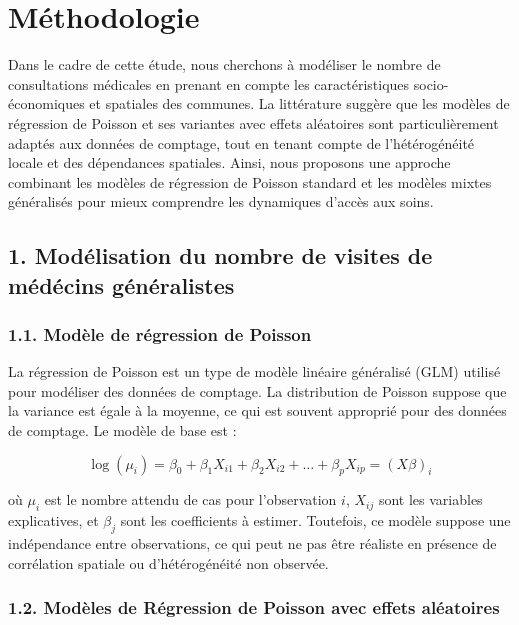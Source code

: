 \documentclass[
]{article}
\author{}
\date{\vspace{-2.5em}}
\begin{document}
\section{Méthodologie}\label{muxe9thodologie}

Dans le cadre de cette étude, nous cherchons à modéliser le nombre de
consultations médicales en prenant en compte les caractéristiques
socio-économiques et spatiales des communes. La littérature suggère que
les modèles de régression de Poisson et ses variantes avec effets
aléatoires sont particulièrement adaptés aux données de comptage, tout
en tenant compte de l'hétérogénéité locale et des dépendances spatiales.
Ainsi, nous proposons une approche combinant les modèles de régression
de Poisson standard et les modèles mixtes généralisés pour mieux
comprendre les dynamiques d'accès aux soins.

\subsection{1. Modélisation du nombre de visites de médécins
généralistes}\label{moduxe9lisation-du-nombre-de-visites-de-muxe9duxe9cins-guxe9nuxe9ralistes}

\subsubsection{1.1. Modèle de régression de
Poisson}\label{moduxe8le-de-ruxe9gression-de-poisson}

La régression de Poisson est un type de modèle linéaire généralisé (GLM)
utilisé pour modéliser des données de comptage. La distribution de
Poisson suppose que la variance est égale à la moyenne, ce qui est
souvent approprié pour des données de comptage. Le modèle de base est :

\[
\log(\mu_i) = \beta_0 + \beta_1 X_{i1} + \beta_2 X_{i2} + \dots + \beta_p X_{ip} = (X\beta)_i
\]

où \(\mu_i\) est le nombre attendu de cas pour l'observation \(i\),
\(X_{ij}\) sont les variables explicatives, et \(\beta_j\) sont les
coefficients à estimer. Toutefois, ce modèle suppose une indépendance
entre observations, ce qui peut ne pas être réaliste en présence de
corrélation spatiale ou d'hétérogénéité non observée.

\subsubsection{1.2. Modèles de Régression de Poisson avec effets
aléatoires}\label{moduxe8les-de-ruxe9gression-de-poisson-avec-effets-aluxe9atoires}
\end{document}
